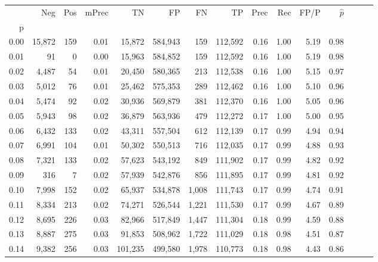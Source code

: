 \begin{tabular}{rrrrrrrrrrrrrrr}
\toprule
{} &     Neg &    Pos & mPrec &       TN &       FP &       FN &       TP &  Prec &   Rec &  FP/P & $\hat{p}$ \\
p    &         &        &       &          &          &          &          &       &       &       &           \\
\midrule
0.00 &  15,872 &    159 &  0.01 &   15,872 &  584,943 &      159 &  112,592 &  0.16 &  1.00 &  5.19 &      0.98 \\
0.01 &      91 &      0 &  0.00 &   15,963 &  584,852 &      159 &  112,592 &  0.16 &  1.00 &  5.19 &      0.98 \\
0.02 &   4,487 &     54 &  0.01 &   20,450 &  580,365 &      213 &  112,538 &  0.16 &  1.00 &  5.15 &      0.97 \\
0.03 &   5,012 &     76 &  0.01 &   25,462 &  575,353 &      289 &  112,462 &  0.16 &  1.00 &  5.10 &      0.96 \\
0.04 &   5,474 &     92 &  0.02 &   30,936 &  569,879 &      381 &  112,370 &  0.16 &  1.00 &  5.05 &      0.96 \\
0.05 &   5,943 &     98 &  0.02 &   36,879 &  563,936 &      479 &  112,272 &  0.17 &  1.00 &  5.00 &      0.95 \\
0.06 &   6,432 &    133 &  0.02 &   43,311 &  557,504 &      612 &  112,139 &  0.17 &  0.99 &  4.94 &      0.94 \\
0.07 &   6,991 &    104 &  0.01 &   50,302 &  550,513 &      716 &  112,035 &  0.17 &  0.99 &  4.88 &      0.93 \\
0.08 &   7,321 &    133 &  0.02 &   57,623 &  543,192 &      849 &  111,902 &  0.17 &  0.99 &  4.82 &      0.92 \\
0.09 &     316 &      7 &  0.02 &   57,939 &  542,876 &      856 &  111,895 &  0.17 &  0.99 &  4.81 &      0.92 \\
0.10 &   7,998 &    152 &  0.02 &   65,937 &  534,878 &    1,008 &  111,743 &  0.17 &  0.99 &  4.74 &      0.91 \\
0.11 &   8,334 &    213 &  0.02 &   74,271 &  526,544 &    1,221 &  111,530 &  0.17 &  0.99 &  4.67 &      0.89 \\
0.12 &   8,695 &    226 &  0.03 &   82,966 &  517,849 &    1,447 &  111,304 &  0.18 &  0.99 &  4.59 &      0.88 \\
0.13 &   8,887 &    275 &  0.03 &   91,853 &  508,962 &    1,722 &  111,029 &  0.18 &  0.98 &  4.51 &      0.87 \\
0.14 &   9,382 &    256 &  0.03 &  101,235 &  499,580 &    1,978 &  110,773 &  0.18 &  0.98 &  4.43 &      0.86 \\

\end{tabular}
